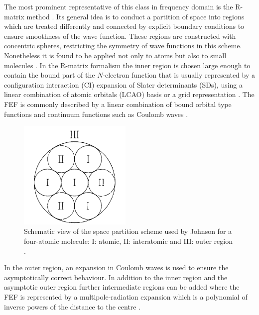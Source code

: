 The most prominent representative of this class in frequency domain is the R-matrix method \cite{r-mat, r-mat2,Burke}.
Its general idea is to conduct a partition of space into regions which are treated differently and connected by explicit boundary conditions to ensure smoothness of the wave function.
These regions are constructed with concentric spheres, restricting the symmetry of wave functions in this scheme.
Nonetheless it is found to be applied not only to atoms \cite{Li-R,Li-R1,Li-R2} but also to small molecules \cite{R-mol1,R-mol2}.
In the R-matrix formalism the inner region is chosen large enough to contain the bound part of the $N$-electron function that is usually represented by a configuration interaction (CI) expansion of Slater determinants (SDs), using a linear combination of atomic orbitals (LCAO) basis or a grid representation \cite{Burke}.
The FEF is commonly described by a linear combination of bound orbital type functions and continuum functions such as Coulomb waves \cite{r-mat, r-mat2}. %
\begin{figure}
   \includegraphics[width=0.48\textwidth]{Figures/JohnsonSpheres}
   \caption{Schematic view of the space partition scheme used by Johnson for a four-atomic molecule:
    I: atomic, II: interatomic and III: outer region \cite{johnson}.}
   \label{fig:johnson}
\end{figure}
In the outer region, an expansion in Coulomb waves is used to ensure the asymptotically correct behaviour.
In addition to the inner region and the asymptotic outer region further intermediate regions can be added  where the FEF is represented by a multipole-radiation expansion which is a polynomial of inverse powers of the distance to the centre \cite{Burke}.

